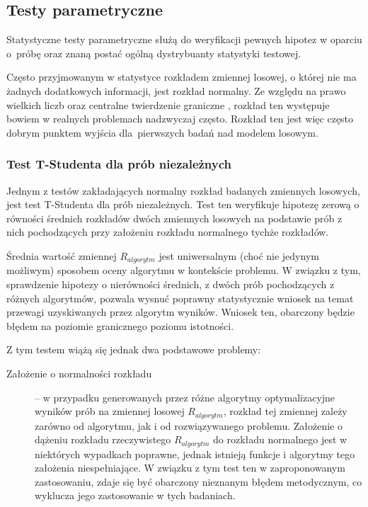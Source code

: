 \documentclass[12pt,a4paper]{report}
\begin{document}
{{{{\subsection{Testy parametryczne}
\par{
Statystyczne testy parametryczne służą do weryfikacji pewnych hipotez w oparciu o~próbę oraz znaną postać ogólną dystrybuanty statystyki testowej.
\par{
Często przyjmowanym w statystyce rozkładem zmiennej losowej, o której nie ma żadnych dodatkowych informacji, jest rozkład normalny. Ze względu na prawo wielkich liczb oraz centralne twierdzenie graniczne \cite{centrallimit}, rozkład ten występuje bowiem w realnych problemach nadzwyczaj często. Rozkład ten jest więc często dobrym punktem wyjścia dla~pierwszych badań nad modelem losowym.
}
\subsubsection{Test T-Studenta dla prób niezależnych}
\par{
Jednym z testów zakładających normalny rozkład badanych zmiennych losowych, jest test T-Studenta dla prób niezależnych. Test ten weryfikuje hipotezę zerową o równości średnich rozkładów dwóch zmiennych losowych na podstawie prób z nich pochodzących przy założeniu rozkładu normalnego tychże rozkładów.
}
\par{
Średnia wartość zmiennej $R_{algorytm}$ jest uniwersalnym (choć nie jedynym możliwym) sposobem oceny algorytmu w kontekście problemu. W związku z tym, sprawdzenie hipotezy o nierówności średnich, z dwóch prób pochodzących z różnych algorytmów, pozwala wysnuć poprawny statystycznie wniosek na temat przewagi uzyskiwanych przez algorytm wyników. Wniosek ten, obarczony będzie błędem na poziomie granicznego poziomu istotności.
}
\par{
Z tym testem wiążą się jednak dwa podstawowe problemy:
\begin{description}
\item[Założenie o normalności rozkładu] -- w przypadku generowanych przez różne algorytmy optymalizacyjne wyników prób na zmiennej losowej $R_{algorytm}$, rozkład tej zmiennej zależy zarówno od algorytmu, jak i od rozwiązywanego problemu. Założenie o dążeniu rozkładu rzeczywistego $R_{algorytm}$ do rozkładu normalnego jest w niektórych wypadkach poprawne, jednak istnieją funkcje i algorytmy tego założenia niespełniające. W związku z tym test ten  w zaproponowanym zastosowaniu, zdaje się być obarczony nieznanym błędem metodycznym, co wyklucza jego zastosowanie w tych badaniach.

\end{description}}}}}}}
\end{document}
